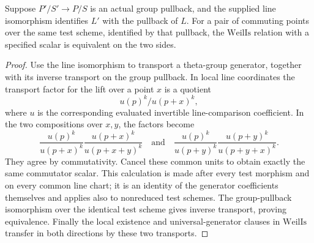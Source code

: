 \begin{lemma}
\label{lem:ftb-weil-actual-polarized-pullback}
Suppose \(P'/S'\to P/S\) is an actual group pullback,
and the supplied line isomorphism identifies \(L'\)
with the pullback of \(L\).
For a pair of commuting points over the same test
scheme, identified by that pullback, the \(\mathrm{WeilIs}\)
relation with a specified scalar is equivalent on the
two sides.
\end{lemma}
\begin{proof}
Use the line isomorphism to transport a theta-group
generator, together with its inverse transport on the
group pullback.
In local line coordinates the transport factor for
the lift over a point \(x\) is a quotient
\[
                             u(p)^k/u(p+x)^k,
\]
where \(u\) is the corresponding evaluated invertible
line-comparison coefficient.
In the two compositions over \(x,y\), the factors become
\[
       \frac{u(p)^k}{u(p+x)^k}
       \frac{u(p+x)^k}{u(p+x+y)^k}
       \quad\text{and}\quad
       \frac{u(p)^k}{u(p+y)^k}
       \frac{u(p+y)^k}{u(p+y+x)^k}.
\]
They agree by commutativity.
Cancel these common units to obtain exactly the same
commutator scalar.
This calculation is made after every test morphism and
on every common line chart; it is an identity of the
generator coefficients themselves and applies also to
nonreduced test schemes.
The group-pullback isomorphism over the identical test
scheme gives inverse transport, proving equivalence.
Finally the local existence and universal-generator
clauses in \(\mathrm{WeilIs}\) transfer in both directions
by these two transports.
\end{proof}

